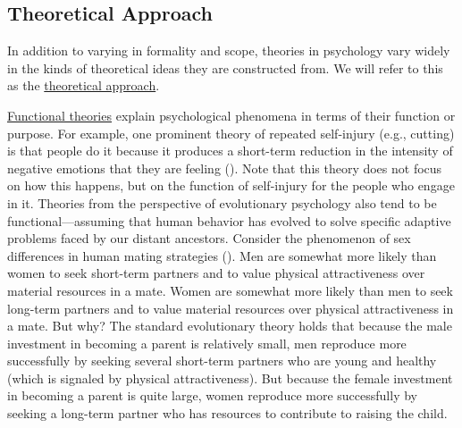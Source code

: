 \documentclass[
]{krantz}
\begin{document}
\subsection*{Theoretical Approach}\label{theoretical-approach}


In addition to varying in formality and scope, theories in psychology vary widely in the kinds of theoretical ideas they are constructed from. We will refer to this as the \hyperref[theoretical-approach]{theoretical approach}.

\hyperref[functional-theory]{Functional theories} explain psychological phenomena in terms of their function or purpose. For example, one prominent theory of repeated self-injury (e.g., cutting) is that people do it because it produces a short-term reduction in the intensity of negative emotions that they are feeling (). Note that this theory does not focus on how this happens, but on the function of self-injury for the people who engage in it. Theories from the perspective of evolutionary psychology also tend to be functional---assuming that human behavior has evolved to solve specific adaptive problems faced by our distant ancestors. Consider the phenomenon of sex differences in human mating strategies (). Men are somewhat more likely than women to seek short-term partners and to value physical attractiveness over material resources in a mate. Women are somewhat more likely than men to seek long-term partners and to value material resources over physical attractiveness in a mate. But why? The standard evolutionary theory holds that because the male investment in becoming a parent is relatively small, men reproduce more successfully by seeking several short-term partners who are young and healthy (which is signaled by physical attractiveness). But because the female investment in becoming a parent is quite large, women reproduce more successfully by seeking a long-term partner who has resources to contribute to raising the child.
\end{document}
